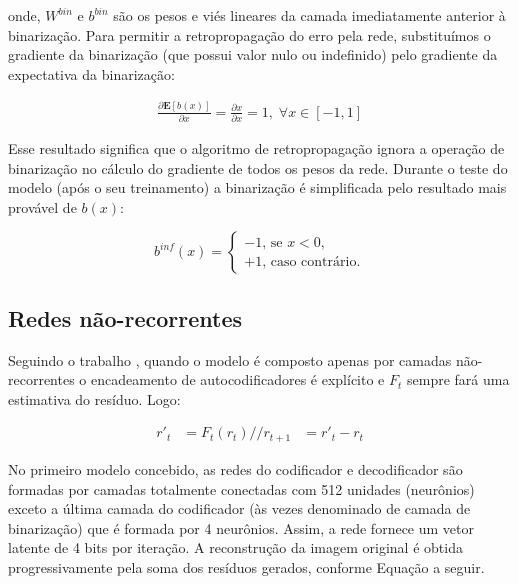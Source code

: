 onde, $W^{bin}$ e $b^{bin}$ são os pesos e viés lineares da camada imediatamente anterior à binarização. Para permitir a retropropagação do erro pela rede, substituímos o gradiente da binarização (que possui valor nulo ou indefinido) pelo gradiente da expectativa da binarização:

\begin{equation}
\begin{aligned}
\displaystyle \frac{\partial \mathbf{E}[b(x)]}{\partial x} = \displaystyle \frac{\partial x}{\partial x} =1,  \; \forall x \in [-1, 1] 
\end{aligned}
\end{equation}

Esse resultado significa que o algoritmo de retropropagação ignora a operação de binarização no cálculo do gradiente de todos os pesos da rede. 
Durante o teste do modelo (após o seu treinamento) a binarização é simplificada pelo resultado mais provável de $b(x)$:

\begin{equation}
b^{inf}(x) = \left\{
\begin{array}{ll}
-1 \text{, se } x < 0, \\
+1 \text{, caso contrário}.
\end{array}
\right. 
\end{equation}

\subsection{Redes não-recorrentes}

Seguindo o trabalho \cite{Variable2016Toderici}, quando o modelo é composto apenas por camadas não-recorrentes o encadeamento de autocodificadores é explícito e $F_t$ sempre fará uma estimativa do resíduo. Logo:


\begin{equation}
\label{eq:reconst_escalar}
\begin{aligned}
r'_{t}  &= F_t(r_{t}) //
r_{t+1} &= r'_{t} - r_{t}
\end{aligned}
\end{equation}

No primeiro modelo concebido, as redes do codificador e decodificador são formadas por camadas totalmente conectadas com 512 unidades (neurônios) exceto a última camada do codificador (às vezes denominado de camada de binarização) que é formada por 4 neurônios. Assim, a rede fornece um vetor latente de 4 bits por iteração. A reconstrução da imagem original é obtida progressivamente pela soma dos resíduos gerados, conforme Equação a seguir.


